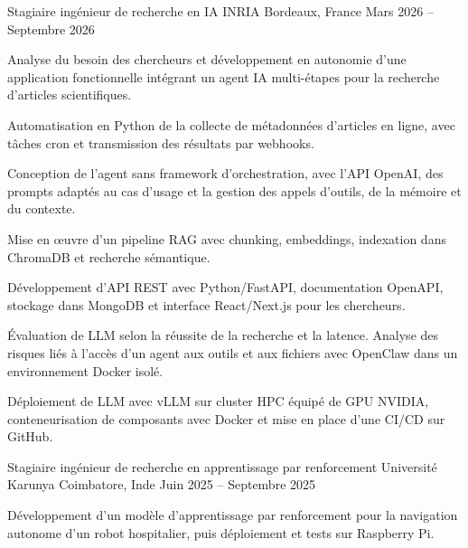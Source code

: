 
\begin{cventries}
  \cventry
    {Stagiaire ingénieur de recherche en IA}
    {INRIA}
    {Bordeaux, France}
    {Mars 2026 -- Septembre 2026}
    {
      \begin{cvitems}
        \item {Analyse du besoin des chercheurs et développement en autonomie d’une application fonctionnelle intégrant un agent IA multi-étapes pour la recherche d’articles scientifiques.}
        \item {Automatisation en Python de la collecte de métadonnées d’articles en ligne, avec tâches cron et transmission des résultats par webhooks.}
        \item {Conception de l’agent sans framework d’orchestration, avec l’API OpenAI, des prompts adaptés au cas d’usage et la gestion des appels d’outils, de la mémoire et du contexte.}
        \item {Mise en œuvre d’un pipeline RAG avec chunking, embeddings, indexation dans ChromaDB et recherche sémantique.}
        \item {Développement d’API REST avec Python/FastAPI, documentation OpenAPI, stockage dans MongoDB et interface React/Next.js pour les chercheurs.}
        \item {Évaluation de LLM selon la réussite de la recherche et la latence. Analyse des risques liés à l’accès d’un agent aux outils et aux fichiers avec OpenClaw dans un environnement Docker isolé.}
        \item {Déploiement de LLM avec vLLM sur cluster HPC équipé de GPU NVIDIA, conteneurisation de composants avec Docker et mise en place d’une CI/CD sur GitHub.}
      \end{cvitems}
    }

  \cventry
    {Stagiaire ingénieur de recherche en apprentissage par renforcement}
    {Université Karunya}
    {Coimbatore, Inde}
    {Juin 2025 -- Septembre 2025}
    {
      \begin{cvitems}
        \item {Développement d’un modèle d’apprentissage par renforcement pour la navigation autonome d’un robot hospitalier, puis déploiement et tests sur Raspberry Pi.}
      \end{cvitems}
    }
\end{cventries}
